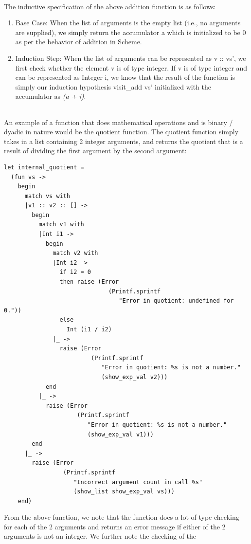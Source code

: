 \\
The inductive specification of the above addition function is as follows:
\begin{enumerate}
   \item Base Case: When the list of arguments is the empty list (i.e., no arguments are supplied), we simply return the accumulator a which is initialized to be 0 as per the behavior of addition in Scheme.
   \item Induction Step: When the list of arguments can be represented as v :: vs’, we first check whether the element v is of type integer. If v is of type integer and can be represented as Integer i, 
   we know that the result of the function is simply our induction hypothesis visit\_add vs’ initialized with the accumulator as \textit{(a + i)}.
\end{enumerate}
\\
An example of a function that does mathematical operations and is binary / dyadic in nature would be the quotient function. The quotient function simply takes in a list containing 2 integer arguments, and 
returns the quotient that is a result of dividing the first argument by the second argument:
\begin{scriptsize}
\begin{verbatim}
let internal_quotient =
  (fun vs ->
    begin
      match vs with
      |v1 :: v2 :: [] ->
        begin
          match v1 with
          |Int i1 ->
            begin
              match v2 with
              |Int i2 ->
                if i2 = 0
                then raise (Error
                              (Printf.sprintf
                                 "Error in quotient: undefined for 0."))
                else
                  Int (i1 / i2)
              |_ ->
                raise (Error
                         (Printf.sprintf
                            "Error in quotient: %s is not a number."
                            (show_exp_val v2)))
            end
          |_ ->
            raise (Error
                     (Printf.sprintf
                        "Error in quotient: %s is not a number."
                        (show_exp_val v1)))
        end
      |_ ->
        raise (Error
                 (Printf.sprintf
                    "Incorrect argument count in call %s"
                    (show_list show_exp_val vs)))
    end)
\end{verbatim}
\end{scriptsize}
From the above function, we note that the function does a lot of type checking for each of the 2 arguments and returns an error message if either of the 2 arguments is not an integer. We further note the checking of the 
